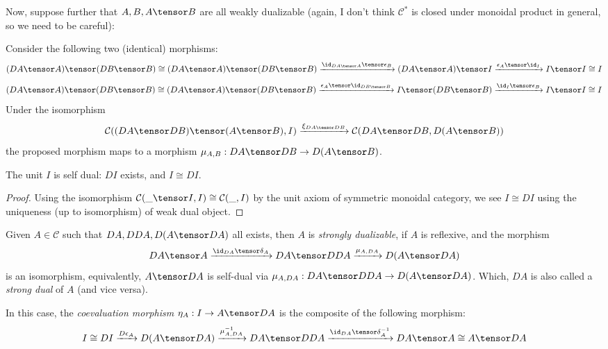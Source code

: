 \documentclass{article}
\begin{document}
Now, suppose further that $A,B,A\tensor B$ are all weakly dualizable (again, I don't think $\mathcal{C}^*$ is closed under monoidal product in general, so we need to be careful):
\begin{defn}
    Consider the following two (identical) morphisms:
    \[(DA\tensor A)\tensor (DB\tensor B)\cong(DA\tensor A)\tensor (DB\tensor B)\xrightarrow{\id_{DA\tensor A}\tensor \epsilon_B} (DA\tensor A)\tensor I\xrightarrow{\epsilon_A\tensor \id_I}I\tensor I\cong I\]
    \[(DA\tensor A)\tensor (DB\tensor B)\cong(DA\tensor A)\tensor (DB\tensor B)\xrightarrow{\epsilon_A\tensor \id_{DB\tensor B}} I\tensor (DB\tensor B)\xrightarrow{\id_I\tensor \epsilon_B}I\tensor I\cong I\]
    Under the isomorphism
    \[\mathcal{C}((DA\tensor DB)\tensor (A\tensor B),I)\xrightarrow{\xi_{DA\tensor DB}}\mathcal{C}(DA\tensor DB, D(A\tensor B))\]
    the proposed morphism maps to a morphism $\mu_{A,B}:DA\tensor DB\rightarrow D(A\tensor B)$.
\end{defn}

\hfil

\begin{prop}
    The unit $I$ is self dual: $DI$ exists, and $I\cong DI$.
\end{prop}
\begin{proof}
    Using the isomorphism $\mathcal{C}(\_\tensor I,I)\cong \mathcal{C}(\_,I)$ by the unit axiom of symmetric monoidal category, we see $I\cong DI$ using the uniqueness (up to isomorphism) of weak dual object.
\end{proof}

\hfil

\begin{defn}
    Given $A\in\mathcal{C}$ such that $DA,DDA, D(A\tensor DA)$ all exists, then $A$ is \emph{strongly dualizable}, if $A$ is reflexive, and the morphism
    \[DA\tensor A\xrightarrow{\id_{DA}\tensor \delta_A} DA\tensor DDA \xrightarrow{\mu_{A,DA}} D(A\tensor DA)\]
    is an isomorphism, equivalently, $A\tensor DA$ is self-dual via $\mu_{A,DA}:DA\tensor DDA\rightarrow D(A\tensor DA)$. Which, $DA$ is also called a \emph{strong dual} of $A$ (and vice versa).

    \hfil

    In this case, the \emph{coevaluation morphism} $\eta_A:I\rightarrow A\tensor DA$ is the composite of the following morphism:
    \[I\cong DI \xrightarrow{D\epsilon_A} D(A\tensor DA)\xrightarrow{\mu_{A,DA}^{-1}} DA\tensor DDA \xrightarrow{\id_{DA}\tensor \delta_A^{-1}}DA\tensor A\cong A\tensor DA\]
\end{defn}
\end{document}

